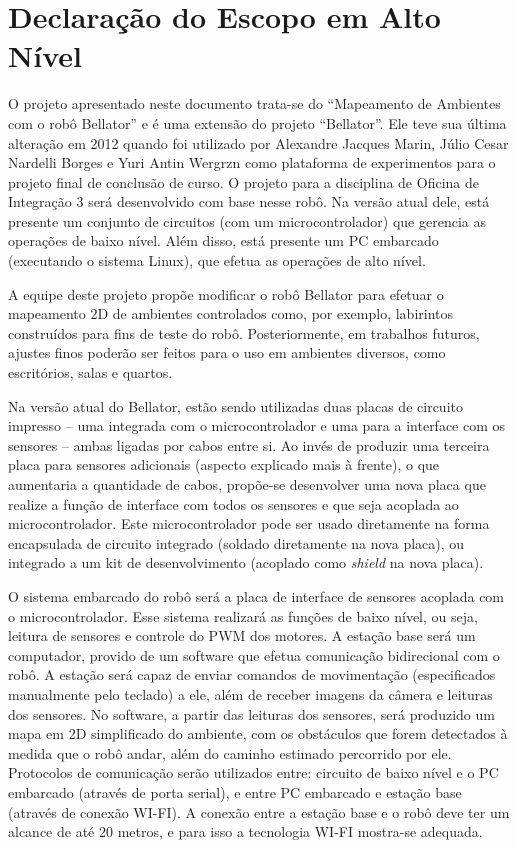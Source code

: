 \chapter{Declaração do Escopo em Alto Nível}

O projeto apresentado neste documento trata-se do “Mapeamento de Ambientes com o robô Bellator” e é uma extensão do projeto “Bellator”. Ele teve sua última alteração em 2012 quando foi utilizado por Alexandre Jacques Marin, Júlio Cesar Nardelli Borges e Yuri Antin Wergrzn como plataforma de experimentos para o projeto final de conclusão de curso. O projeto para a disciplina de Oficina de Integração 3 será desenvolvido com base nesse robô. Na versão atual dele, está presente um conjunto de circuitos (com um microcontrolador) que gerencia as operações de baixo nível. Além disso, está presente um PC embarcado (executando o sistema Linux), que efetua as operações de alto nível.

A equipe deste projeto propõe modificar o robô Bellator para efetuar o mapeamento 2D de ambientes controlados como, por exemplo, labirintos construídos para fins de teste do robô. Posteriormente, em trabalhos futuros, ajustes finos poderão ser feitos para o uso em ambientes diversos, como escritórios, salas e quartos.

Na versão atual do Bellator, estão sendo utilizadas duas placas de circuito impresso – uma integrada com o microcontrolador e uma para a interface com os sensores – ambas ligadas por cabos entre si. Ao invés de produzir uma terceira placa para sensores adicionais (aspecto explicado mais à frente), o que aumentaria a quantidade de cabos, propõe-se desenvolver uma nova placa que realize a função de interface com todos os sensores e que seja acoplada ao microcontrolador. Este microcontrolador pode ser usado diretamente na forma encapsulada de circuito integrado (soldado diretamente na nova placa), ou integrado a um kit de desenvolvimento (acoplado como \textit{shield} na nova placa).

O sistema embarcado do robô será a placa de interface de sensores acoplada com o microcontrolador. Esse sistema realizará as funções de baixo nível, ou seja, leitura de sensores e controle do PWM dos motores. A estação base será um computador, provido de um software que efetua comunicação bidirecional com o robô. A estação será capaz de enviar comandos de movimentação (especificados manualmente pelo teclado) a ele, além de receber imagens da câmera e leituras dos sensores. No software, a partir das leituras dos sensores, será produzido um mapa em 2D simplificado do ambiente, com os obstáculos que forem detectados à medida que o robô andar, além do caminho estimado percorrido por ele. Protocolos de comunicação serão utilizados entre: circuito de baixo nível e o PC embarcado (através de porta serial), e entre PC embarcado e estação base (através de conexão WI-FI). A conexão entre a estação base e o robô deve ter um alcance de até 20 metros, e para isso a tecnologia WI-FI mostra-se adequada.

